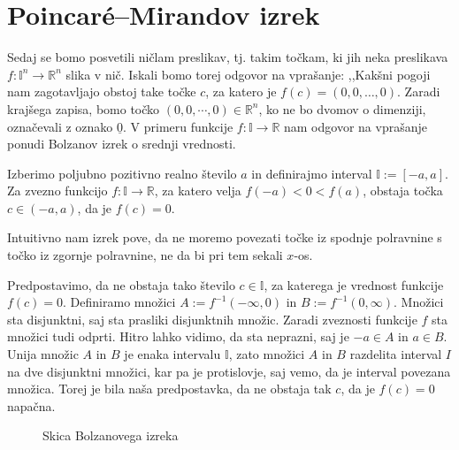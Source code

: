 \documentclass[mat1]{fmfdelo}
\newcommand{\R}{\mathbb R}
\newcommand{\I}{\mathbb I}
\newcommand{\0}{\underline{0}}
\begin{document}
\section{Poincar\'e--Mirandov izrek}\label{raz:PM}
Sedaj se bomo posvetili ničlam preslikav, tj. takim točkam, ki jih neka preslikava $f : \I^n \to \R^n$ slika v nič. Iskali bomo torej odgovor na vprašanje: ,,Kakšni pogoji nam zagotavljajo obstoj take točke $c$, za katero je $f(c) = (0, 0, \dots, 0)$. Zaradi krajšega zapisa, bomo točko $(0, 0, \cdots, 0) \in \R^n$, ko ne bo dvomov o dimenziji, označevali z oznako $\0$. V primeru funkcije $f : \I \to \R$ nam odgovor na vprašanje ponudi Bolzanov izrek o srednji vrednosti.
\begin{izrek}\label{izr:bolzano}
Izberimo poljubno pozitivno realno število $a$ in definirajmo interval $\I := [-a, a]$. Za zvezno funkcijo $f : \I \to \R$, za katero velja $f(-a) < 0 < f(a)$, obstaja točka $c \in (-a, a)$, da je $f(c) = 0$.
\end{izrek}
Intuitivno nam izrek pove, da ne moremo povezati točke iz spodnje polravnine s točko iz zgornje polravnine, ne da bi pri tem sekali $x$-os. 
\begin{dokaz}
Predpostavimo, da ne obstaja tako število $c \in \I$, za katerega je vrednost funkcije $f(c) = 0$. Definiramo množici $A := f^{-1}(- \infty, 0)$ in $B := f^{-1}(0, \infty)$. Množici sta disjunktni, saj sta prasliki disjunktnih množic. Zaradi zveznosti funkcije $f$ sta množici tudi odprti. Hitro lahko vidimo, da sta neprazni, saj je $-a \in A$ in $a \in B$. Unija množic $A$ in $B$ je enaka intervalu $\I$, zato množici $A$ in $B$ razdelita interval $I$ na dve disjunktni množici, kar pa je protislovje, saj vemo, da je interval povezana množica. Torej je bila naša predpostavka, da ne obstaja tak $c$, da je $f(c) = 0$ napačna.
\end{dokaz}

\begin{figure}[h!]
	\centering
	\caption{Skica Bolzanovega izreka}
\end{figure}
\end{document}
